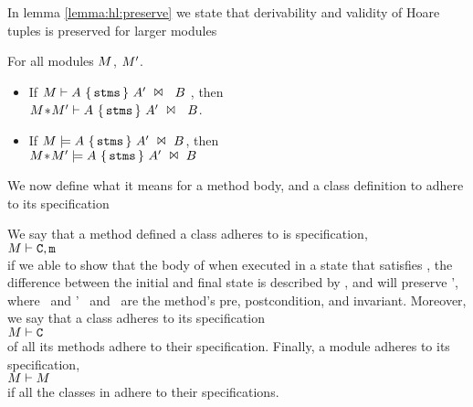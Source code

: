 In lemma \ref{lemma:hl:preserve}  we state that  derivability and validity of Hoare tuples is preserved for larger modules
\begin{theorem}
\label{lemma:hl:preserve}
For all modules $\M$, $\M'$.

\begin{itemize}
\item
If $\HoareExpl {\A} {\prg{stms}}  {\M} {\A'} {\B}$ , then\\ $\HoareExpl {\A} {\prg{stms}}  {\M\!*\!\M'} {\A'} {\B}$.
\item
{If $\M\models \HoareImpl {\A} {\prg{stms}}  {\A'} {\B}$, then \\
$\M\!*\!\M'\models \HoareImpl {\A} {\prg{stms}}  {\A'} {\B}$}
\end{itemize}
\end{theorem}

We now define what it means for a method body, and a class definition to adhere to its specification

We say that a method  defined a class  adheres to is specification, \\
\SP\SP $\M \vdash \prg{C},\prg{m}$\\
if we able to show that the body of  when executed in a state that satisfies \A,  the difference between the initial and final state is described by \B, and will preserve \B', 
 where \A\ and \B' \  and \B\ are the method's pre,   postcondition, and invariant.
 Moreover, we say that a class adheres to its specification\\
\SP\SP $\M \vdash \prg{C}$\\
 of all its methods adhere to their specification.
 Finally, a module adheres to its specification, \\
\SP\SP $\M \vdash \M$\\ 
if all the classes in \M adhere to their specifications. 

